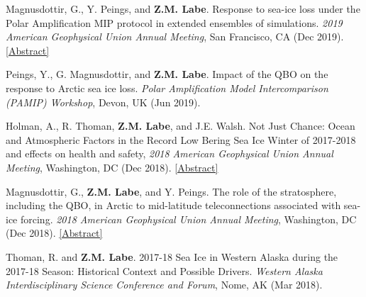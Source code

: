 \documentclass[margin,line,palatino,courier,10pt]{res}
\begin{document}
\begin{resume}
\begin{etaremune}[leftmargin=0in,topsep=0in,parsep=0in]
\item Magnusdottir, G., Y. Peings, and \textbf{Z.M. Labe}. Response to sea-ice loss under the Polar Amplification MIP protocol in extended ensembles of simulations. \textit{2019 American Geophysical Union Annual Meeting}, San Francisco, CA (Dec 2019). \href{https://agu.confex.com/agu/fm19/meetingapp.cgi/Paper/553470}{[Abstract]}
\item Peings, Y., G. Magnusdottir, and \textbf{Z.M. Labe}. Impact of the QBO on the response to Arctic sea ice loss. \textit{Polar Amplification Model Intercomparison (PAMIP) Workshop}, Devon, UK (Jun 2019).
\item Holman, A., R. Thoman, \textbf{Z.M. Labe}, and J.E. Walsh. Not Just Chance: Ocean and Atmospheric Factors in the Record Low Bering Sea Ice Winter of 2017-2018 and effects on health and safety, \textit{2018 American Geophysical Union Annual Meeting}, Washington, DC (Dec 2018). \href{https://agu.confex.com/agu/fm18/meetingapp.cgi/Paper/451295}{[Abstract]}
\item Magnusdottir, G., \textbf{Z.M. Labe}, and Y. Peings. The role of the stratosphere, including the QBO, in Arctic to mid-latitude teleconnections associated with sea-ice forcing. \textit{2018 American Geophysical Union Annual Meeting}, Washington, DC (Dec 2018). \href{https://agu.confex.com/agu/fm18/meetingapp.cgi/Paper/399117}{[Abstract]}
\item Thoman, R. and \textbf{Z.M. Labe}. 2017-18 Sea Ice in Western Alaska during the 2017-18 Season: Historical Context and Possible Drivers. \textit{Western Alaska Interdisciplinary Science Conference and Forum}, Nome, AK (Mar 2018). 

\end{etaremune}

\vspace{-0.1in}
\noindent\textcolor{MidnightBlue}{\makebox[\linewidth][r]{\rule{\textwidth}{5pt}}}
\vspace{-0.3in}


\end{resume}
\end{document}
